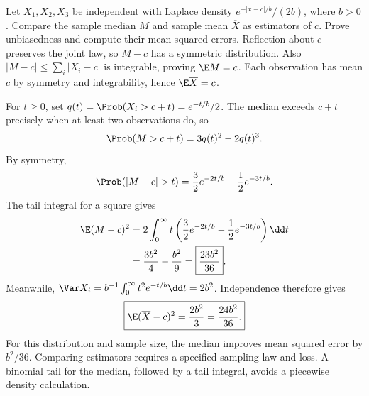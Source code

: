 Let $X_1,X_2,X_3$ be independent with Laplace density $e^{-|x-c|/b}/(2b)$, where $b>0$. Compare the sample median $M$ and sample mean $\overline X$ as estimators of $c$. Prove unbiasedness and compute their mean squared errors.
\solution Reflection about $c$ preserves the joint law, so $M-c$ has a symmetric distribution. Also $|M-c|\le\sum_i|X_i-c|$ is integrable, proving $\E M=c$. Each observation has mean $c$ by symmetry and integrability, hence $\E\overline X=c$.

For $t\ge0$, set $q(t)=\Prob(X_i>c+t)=e^{-t/b}/2$. The median exceeds $c+t$ precisely when at least two observations do, so
\[
\Prob(M>c+t)=3q(t)^2-2q(t)^3.
\]
By symmetry,
\[
\Prob(|M-c|>t)=\frac32e^{-2t/b}-\frac12e^{-3t/b}.
\]
The tail integral for a square gives
\[
\begin{aligned}
\E(M-c)^2
&=2\int_0^\infty t\left(\frac32e^{-2t/b}-\frac12e^{-3t/b}\right)\dd t\\
&=\frac{3b^2}{4}-\frac{b^2}{9}
=\boxed{\frac{23b^2}{36}}.
\end{aligned}
\]
Meanwhile, $\Var X_i=b^{-1}\int_0^\infty t^2e^{-t/b}\dd t=2b^2$. Independence therefore gives
\[
\boxed{\E(\overline X-c)^2=\frac{2b^2}{3}=\frac{24b^2}{36}.}
\]
For this distribution and sample size, the median improves mean squared error by $b^2/36$.
\insight Comparing estimators requires a specified sampling law and loss. A binomial tail for the median, followed by a tail integral, avoids a piecewise density calculation.
